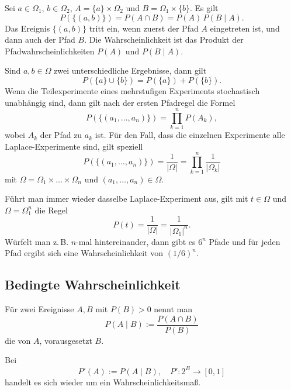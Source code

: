 \minisection{}
Sei $a\in\Omega_1$, $b\in\Omega_2$, $A=\{a\}\times\Omega_2$
und $B=\Omega_1\times\{b\}$. Es gilt%
\begin{equation}
P(\{(a,b)\}) = P(A\cap B) = P(A)\,P(B\mid A).
\end{equation}
Das Ereignis $\{(a,b)\}$ tritt ein, wenn zuerst
der Pfad $A$ eingetreten ist, und dann auch der Pfad $B$.
Die Wahrscheinlichkeit ist das Produkt der Pfadwahrscheinlichkeiten
$P(A)$ und $P(B\mid A)$.

\minisection{}
Sind $a,b\in\Omega$ zwei unterschiedliche
Ergebnisse, dann gilt%
\begin{equation}
P(\{a\}\cup\{b\}) = P(\{a\})+P(\{b\}).
\end{equation}
Wenn die Teilexperimente eines mehrstufigen Experiments
stochastisch unabhängig sind, dann gilt nach der ersten Pfadregel
die Formel%
\begin{equation}
P(\{(a_1,\ldots,a_n)\}) = \prod_{k=1}^n P(A_k),
\end{equation}
wobei $A_k$ der Pfad zu $a_k$ ist.
Für den Fall, dass die einzelnen
Experimente alle Laplace-Experimente sind, gilt speziell%
\begin{equation}
P(\{(a_1,\ldots,a_n)\}) = \frac{1}{|\Omega|} = \prod_{k=1}^n \frac{1}{|\Omega_k|}
\end{equation}
mit $\Omega=\Omega_1\times\ldots\times\Omega_n$ und $(a_1,\ldots,a_n)\in\Omega$.

Führt man immer wieder dasselbe Laplace-Experiment aus, gilt
mit $t\in\Omega$ und $\Omega=\Omega_1^n$ die Regel%
\begin{equation}
P(t) = \frac{1}{|\Omega|} = \frac{1}{|\Omega_1|^n}.
\end{equation}
Würfelt man z.\,B. $n$-mal hintereinander, dann gibt es $6^n$ Pfade
und für jeden Pfad ergibt sich eine Wahrscheinlichkeit von $(1/6)^n$.

\subsection{Bedingte Wahrscheinlichkeit}
\begin{definition}\mbox{}\newline%
Für zwei Ereignisse $A,B$ mit $P(B)>0$ nennt man%
\begin{equation}
P(A\mid B) := \frac{P(A\cap B)}{P(B)}
\end{equation}
die  von $A$, vorausgesetzt $B$.
\end{definition}
Bei
\begin{equation}
P'(A) := P(A\mid B),\quad P'\colon 2^B\to [0,1]
\end{equation}
handelt es sich wieder um ein Wahrscheinlichkeitsmaß.

